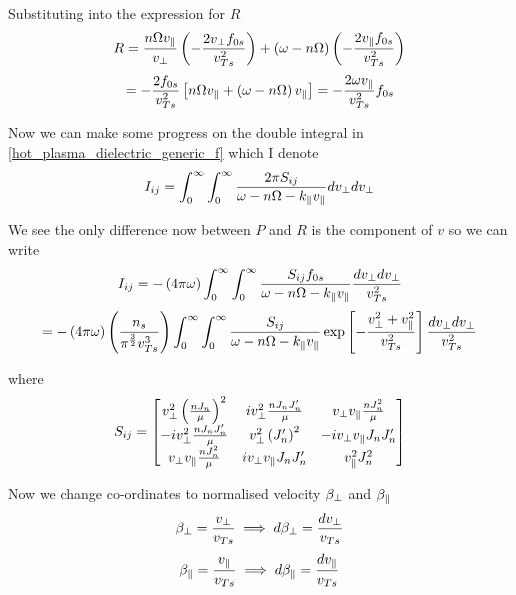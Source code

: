 Substituting into the expression for $R$
\begin{equation*}
	R = \frac{n \Omega v_\parallel}{v_\perp} \left( - \frac{2 v_\perp f_{0s}}{v_{Ts}^2} \right) + \left( \omega - n \Omega \right) \left( - \frac{2 v_\parallel f_{0s}}{v_{Ts}^2} \right)
\end{equation*}
\begin{equation}
	= - \frac{2 f_{0s}}{v_{Ts}^2} \left[ n \Omega v_\parallel + \left( \omega - n \Omega \right) v_\parallel \right] = -\frac{2 \omega v_\parallel}{v_{Ts}^2} f_{0s}
\end{equation}

Now we can make some progress on the double integral in \eqref{hot_plasma_dielectric_generic_f} which I denote
\begin{equation}
	I_{ij} = \int_0^\infty \int_0^\infty \frac{2\pi S_{ij}}{\omega-n\Omega-k_\parallel v_\parallel} dv_\perp dv_\perp
\end{equation}

We see the only difference now between $P$ and $R$ is the component of $v$ so we can write
\begin{equation*}
	I_{ij} = - \left( 4 \pi \omega \right) \int_0^\infty \int_0^\infty \frac{S_{ij} f_{0s}}{\omega-n\Omega-k_\parallel v_\parallel} \frac{dv_\perp dv_\perp}{v_{Ts}^2}
\end{equation*}
\begin{equation}
	= - \left( 4 \pi \omega \right) \left( \frac{n_s}{\pi^{\frac{3}{2}}v_{Ts}^3} \right) \int_0^\infty \int_0^\infty \frac{S_{ij}}{\omega-n\Omega-k_\parallel v_\parallel} \exp \left[ - \frac{v_\perp^2 + v_\parallel^2}{v_{Ts}^2} \right] \frac{dv_\perp dv_\perp}{v_{Ts}^2}
\end{equation}

where
\begin{equation}
	S_{ij} =
	\begin{bmatrix}
		v_\perp^2 \left(\frac{nJ_n}{\mu}\right)^2 & iv_\perp^2 \frac{nJ_nJ_n'}{\mu} & v_\perp v_\parallel \frac{nJ_n^2}{\mu}\\
		- iv_\perp^2 \frac{nJ_nJ_n'}{\mu} & v_\perp^2 \left(J_n'\right)^2 & -i v_\perp v_\parallel J_n J_n'\\
		v_\perp v_\parallel \frac{nJ_n^2}{\mu}  & i v_\perp v_\parallel J_n J_n' & v_\parallel^2 J_n^2\\
	\end{bmatrix}
\end{equation}

Now we change co-ordinates to normalised velocity $\beta_\perp$ and $\beta_\parallel$
\begin{equation*}
	\beta_\perp = \frac{v_\perp}{v_{Ts}} \implies d\beta_\perp = \frac{dv_\perp}{v_{Ts}}
\end{equation*}
\begin{equation*}
	\beta_\parallel = \frac{v_\parallel}{v_{Ts}} \implies d\beta_\parallel = \frac{dv_\parallel}{v_{Ts}}
\end{equation*}

